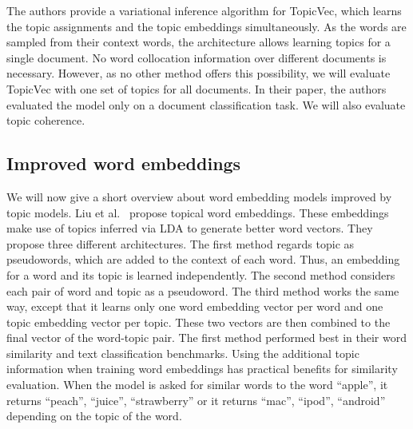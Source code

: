\documentclass[
        a4paper,
        titlepage,
        twoside,
        parskip,
        numbers=noenddot
        ]{scrbook}
\theoremstyle{break}
\begin{document}
The authors provide a variational inference algorithm for TopicVec, which learns the topic assignments and the topic embeddings simultaneously.
As the words are sampled from their context words, the architecture allows learning topics for a single document.
No word collocation information over different documents is necessary.
However, as no other method offers this possibility, we will evaluate TopicVec with one set of topics for all documents.
In their paper, the authors evaluated the model only on a document classification task.
We will also evaluate topic coherence.



\subsection{Improved word embeddings}
We will now give a short overview about word embedding models improved by topic models.
Liu et al.~\cite{Liu2015} propose topical word embeddings.
These embeddings make use of topics inferred via LDA to generate better word vectors.
They propose three different architectures.
The first method regards topic as pseudowords, which are added to the context of each word.
Thus, an embedding for a word and its topic is learned independently.
The second method considers each pair of word and topic as a pseudoword.
The third method works the same way, except that it learns only one word embedding vector per word and one topic embedding vector per topic.
These two vectors are then combined to the final vector of the word-topic pair.
The first method performed best in their word similarity and text classification benchmarks.
Using the additional topic information when training word embeddings has practical benefits for similarity evaluation.
When the model is asked for similar words to the word ``apple'', it returns ``peach'', ``juice'', ``strawberry'' or it returns ``mac'', ``ipod'', ``android'' depending on the topic of the word.
\end{document}
